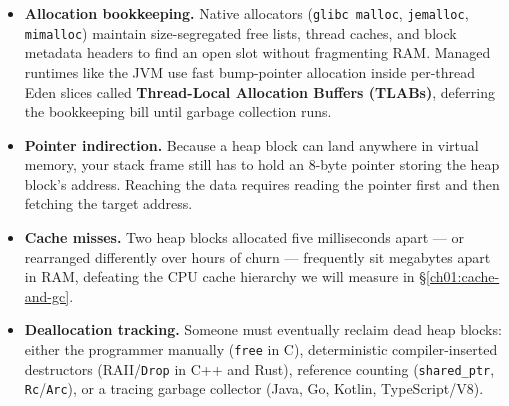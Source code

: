 \begin{itemize}
  \item \textbf{Allocation bookkeeping.} Native allocators (\texttt{glibc malloc}, \texttt{jemalloc}, \texttt{mimalloc}) maintain size-segregated free lists, thread caches, and block metadata headers to find an open slot without fragmenting RAM. Managed runtimes like the JVM use fast bump-pointer allocation inside per-thread Eden slices called \textbf{Thread-Local Allocation Buffers (TLABs)}, deferring the bookkeeping bill until garbage collection runs.
  \item \textbf{Pointer indirection.} Because a heap block can land anywhere in virtual memory, your stack frame still has to hold an 8-byte pointer storing the heap block's address. Reaching the data requires reading the pointer first and then fetching the target address.
  \item \textbf{Cache misses.} Two heap blocks allocated five milliseconds apart --- or rearranged differently over hours of churn --- frequently sit megabytes apart in RAM, defeating the CPU cache hierarchy we will measure in \S\ref{ch01:cache-and-gc}.
  \item \textbf{Deallocation tracking.} Someone must eventually reclaim dead heap blocks: either the programmer manually (\texttt{free} in C), deterministic compiler-inserted destructors (RAII/\texttt{Drop} in C++ and Rust), reference counting (\texttt{shared\_ptr}, \texttt{Rc}/\texttt{Arc}), or a tracing garbage collector (Java, Go, Kotlin, TypeScript/V8).
\end{itemize}

